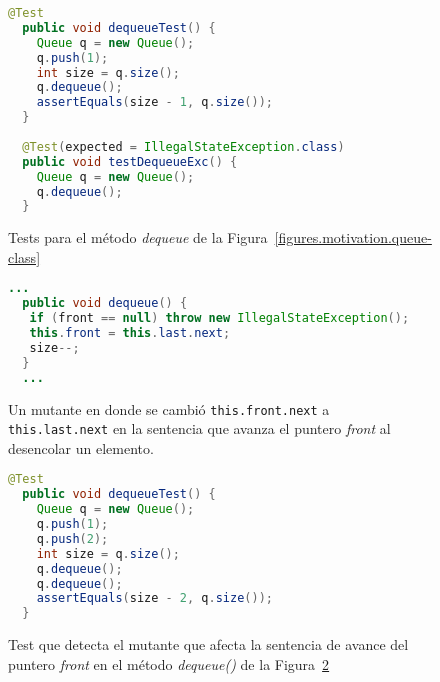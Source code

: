 \begin{figure}[H]
	\begin{lstlisting}[frame=tlrb, mathescape=true, language=Java,basicstyle={},xleftmargin=.01\textwidth,xrightmargin=.01\textwidth]
  @Test
  public void dequeueTest() {
    Queue q = new Queue();
    q.push(1);
    int size = q.size();
    q.dequeue();
    assertEquals(size - 1, q.size());
  }
    
  @Test(expected = IllegalStateException.class)
  public void testDequeueExc() {
    Queue q = new Queue();
    q.dequeue();
  }
	\end{lstlisting}
	\caption{Tests para el m\'etodo \emph{dequeue} de la Figura~\ref{figures.motivation.queue-class}}
	\label{figures.motivation.queue-class-tests}
\end{figure}

\begin{figure}[H]
	\begin{lstlisting}[frame=tlrb, mathescape=true, language=Java,basicstyle={},xleftmargin=.01\textwidth,xrightmargin=.01\textwidth]
  ...
  public void dequeue() {
   if (front == null) throw new IllegalStateException();
   this.front = this.last.next;
   size--;
  }
  ...
	\end{lstlisting}
	\caption[Mutante de expresi\'on de navegaci\'on para \emph{dequeue}]{Un mutante en donde se cambi\'o \lstinline{this.front.next} a \lstinline{this.last.next} en la sentencia que avanza el puntero \emph{front} al desencolar un elemento.}
	\label{figures.motivation.dequeue-prvo-mutant}
\end{figure}

\begin{figure}[H]
	\begin{lstlisting}[frame=tlrb, mathescape=true, language=Java,basicstyle={},xleftmargin=.01\textwidth,xrightmargin=.01\textwidth]
  @Test
  public void dequeueTest() {
    Queue q = new Queue();
    q.push(1);
    q.push(2);
    int size = q.size();
    q.dequeue();
    q.dequeue();
    assertEquals(size - 2, q.size());
  }
	\end{lstlisting}
	\caption[Test que detecta el mutante de la Figura~\ref{figures.motivation.dequeue-prvo-mutant}]{Test que detecta el mutante que afecta la sentencia de avance del puntero \emph{front} en el m\'etodo \emph{dequeue()} de la Figura~\ref{figures.motivation.dequeue-prvo-mutant}}
	\label{figures.motivation.queue-class-tests-prvo}
\end{figure}

